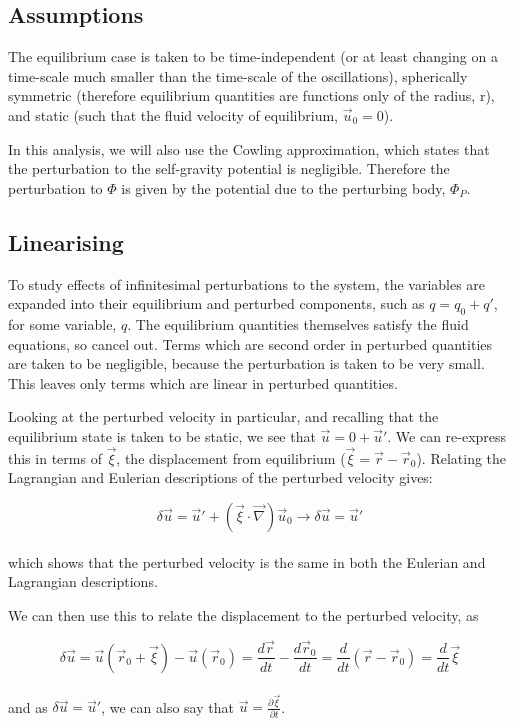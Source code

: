 \documentclass[11pt]{amsart}
\begin{document}
\subsection{Assumptions}

The equilibrium case is taken to be time-independent (or at least changing on a time-scale much 
smaller than the time-scale of the oscillations), spherically symmetric (therefore equilibrium 
quantities are functions only of the radius, r), and static (such that the fluid velocity of 
equilibrium, $\vec{u}_{0} = 0$).

In this analysis, we will also use the Cowling approximation, which states that the perturbation
to the self-gravity potential is negligible.  Therefore the perturbation to $\Phi$ is given by 
the potential due to the perturbing body, $\Phi_{P}$.



\subsection{Linearising}

To study effects of infinitesimal perturbations to the system, the variables are expanded into
their equilibrium and perturbed components, such as $q = q_{0} + q'$, for some variable, $q$.
The equilibrium quantities themselves satisfy the fluid equations, so cancel out.  Terms which are
second order in perturbed quantities are taken to be negligible, because the perturbation is
taken to be very small. This leaves only terms which are linear in perturbed quantities.

Looking at the perturbed velocity in particular, and recalling that the equilibrium state is taken
to be static, we see that $\vec{u} = 0 + \vec{u}'$.  We can re-express this in terms of $\vec{\xi}$,
 the displacement from equilibrium ($\vec{\xi} = \vec{r} - \vec{r}_{0}$).  Relating the Lagrangian and 
Eulerian descriptions of the perturbed velocity gives:

\begin{equation}
\delta \vec{u} = \vec{u}' + (\vec{\xi} \cdot \vec{\nabla}) \vec{u}_{0} \longrightarrow \delta \vec{u} = \vec{u}'
\end{equation}
\\
which shows that the perturbed velocity is the same in both the Eulerian and Lagrangian descriptions.

We can then use this to relate the displacement to the perturbed velocity, as

\begin{equation}
\delta \vec{u} = \vec{u}(\vec{r}_{0} + \vec{\xi}) - \vec{u}(\vec{r}_{0}) = \frac{d\vec{r}}{dt} - \frac{d\vec{r}_{0}}{dt}
= \frac{d}{dt} \left( \vec{r} - \vec{r}_{0} \right) = \frac{d}{dt} \vec{\xi}
\end{equation}
\\
and as $\delta\vec{u} = \vec{u}'$, we can also say that $\vec{u} = \frac{\partial \vec{\xi}}{\partial t}$.
\end{document}
